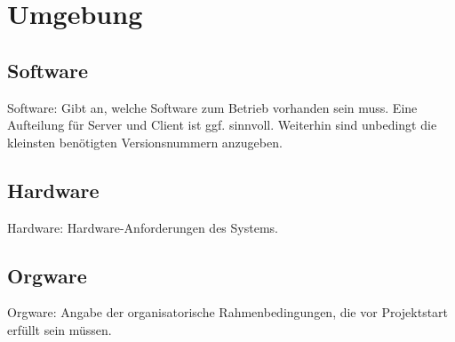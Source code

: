  
\chapter{Umgebung}
 
\section{Software}
Software: Gibt an, welche Software zum Betrieb vorhanden sein muss. Eine
Aufteilung für Server und Client ist ggf. sinnvoll. Weiterhin sind unbedingt die
kleinsten benötigten Versionsnummern anzugeben.
 
\section{Hardware}
Hardware: Hardware-Anforderungen des Systems.
 
\section{Orgware}
Orgware: Angabe der organisatorische Rahmenbedingungen, die vor Projektstart
erfüllt sein müssen.
